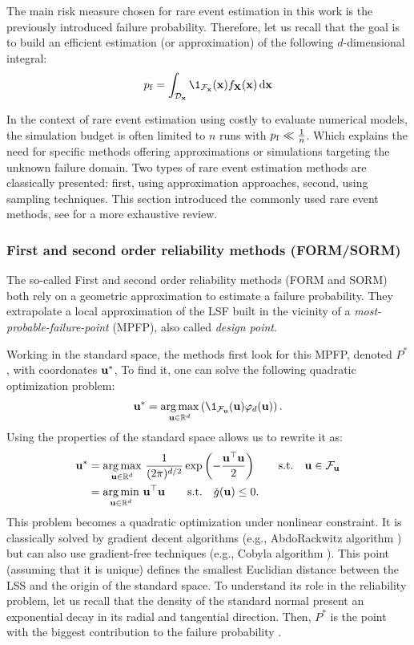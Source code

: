 The main risk measure chosen for rare event estimation in this work is the previously introduced failure probability.
Therefore, let us recall that the goal is to build an efficient estimation (or approximation) of the following $d$-dimensional integral: 
\begin{equation}
    \pf = \int_{\iD_\bx} \1_{\iF_\bx}(\bx) f_\bX(\bx) \, \dd\bx
\end{equation}

In the context of rare event estimation using costly to evaluate numerical models, the simulation budget is often limited to $n$ runs with $p_\mathrm{f} \ll \frac1n$. 
Which explains the need for specific methods offering approximations or simulations targeting the unknown failure domain. 
Two types of rare event estimation methods are classically presented: first, using approximation approaches, second, using sampling techniques. 
This section introduced the commonly used rare event methods, see \cite{MorioBalesdent2015} for a more exhaustive review.


\subsubsection{First and second order reliability methods (FORM/SORM)}

The so-called First and second order reliability methods (FORM and SORM) both rely on a geometric approximation to estimate a failure probability.
They extrapolate a local approximation of the LSF built in the vicinity of a \textit{most-probable-failure-point} (MPFP), also called \textit{design point}.


Working in the standard space, the methods first look for this MPFP, denoted $P^*$, with coordonates ${\bf u}^*$, 
To find it, one can solve the following quadratic optimization problem: 
\begin{equation}
    \bu^* = \argmax_{\bu \in \R^d} \left(\1_{\iF_\bu}(\bu) \varphi_d(\bu)\right).
\end{equation}
Using the properties of the standard space allows us to rewrite it as: 
\begin{align}
    {\bf u}^* &= \operatorname*{arg\,max}_{{\bf u} \in \mathbb{R}^d} \, \frac{1}{(2\pi)^{d/2}} \exp\left(-\frac{{\bf u}^\top {\bf u} }{2} \right) \qquad \mathrm{s.t.} \quad {\bf u} \in \mathcal{F}_{{\bf u}}\\
          &= \operatorname*{arg\,min}_{{\bf u} \in \mathbb{R}^d} \, {\bf u}^\top {\bf u} \qquad \mathrm{s.t.} \quad \check{g}({\bf u}) \leq 0.
\end{align}
This problem becomes a quadratic optimization under nonlinear constraint. 
It is classically solved by gradient decent algorithms (e.g., AbdoRackwitz algorithm ) but can also use gradient-free techniques (e.g., Cobyla algorithm ).
This point (assuming that it is unique) defines the smallest Euclidian distance between the LSS and the origin of the standard space.
To understand its role in the reliability problem, let us recall that the density of the standard normal present an exponential decay in its radial and tangential direction.
Then, $P^*$ is the point with the biggest contribution to the failure probability . 

